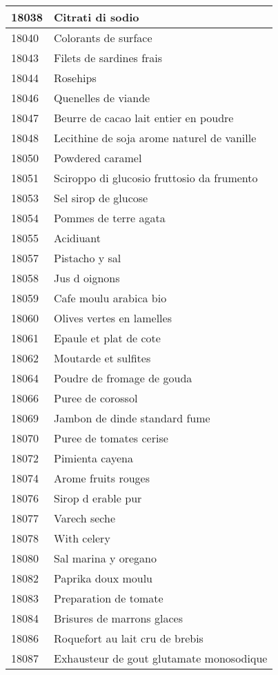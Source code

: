 \begin{longtable}{|l|l|}
18038 & Citrati di sodio \\ \hline 
18040 & Colorants de surface \\ \hline 
18043 & Filets de sardines frais \\ \hline 
18044 & Rosehips \\ \hline 
18046 & Quenelles de viande \\ \hline 
18047 & Beurre de cacao lait entier en poudre \\ \hline 
18048 & Lecithine de soja arome naturel de vanille \\ \hline 
18050 & Powdered caramel \\ \hline 
18051 & Sciroppo di glucosio fruttosio da frumento \\ \hline 
18053 & Sel sirop de glucose \\ \hline 
18054 & Pommes de terre agata \\ \hline 
18055 & Acidiuant \\ \hline 
18057 & Pistacho y sal \\ \hline 
18058 & Jus d oignons \\ \hline 
18059 & Cafe moulu arabica bio \\ \hline 
18060 & Olives vertes en lamelles \\ \hline 
18061 & Epaule et plat de cote \\ \hline 
18062 & Moutarde et sulfites \\ \hline 
18064 & Poudre de fromage de gouda \\ \hline 
18066 & Puree de corossol \\ \hline 
18069 & Jambon de dinde standard fume \\ \hline 
18070 & Puree de tomates cerise \\ \hline 
18072 & Pimienta cayena \\ \hline 
18074 & Arome fruits rouges \\ \hline 
18076 & Sirop d erable pur \\ \hline 
18077 & Varech seche \\ \hline 
18078 & With celery \\ \hline 
18080 & Sal marina y oregano \\ \hline 
18082 & Paprika doux moulu \\ \hline 
18083 & Preparation de tomate \\ \hline 
18084 & Brisures de marrons glaces \\ \hline 
18086 & Roquefort au lait cru de brebis \\ \hline 
18087 & Exhausteur de gout glutamate monosodique \\ \hline 

\end{longtable}
